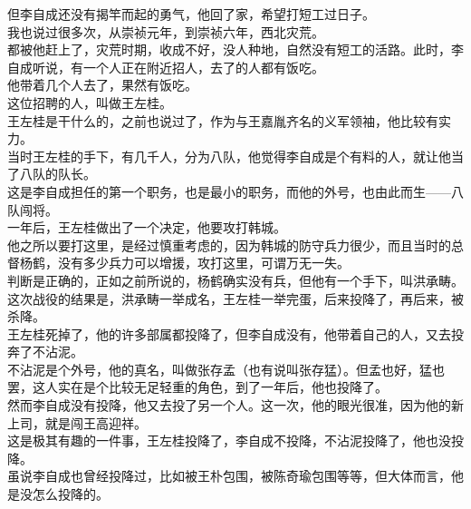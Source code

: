 \begin{multicols}{\theparacolNo}
但李自成还没有揭竿而起的勇气，他回了家，希望打短工过日子。\\

我也说过很多次，从崇祯元年，到崇祯六年，西北灾荒。\\

都被他赶上了，灾荒时期，收成不好，没人种地，自然没有短工的活路。此时，李自成听说，有一个人正在附近招人，去了的人都有饭吃。\\

他带着几个人去了，果然有饭吃。\\

这位招聘的人，叫做王左桂。\\

王左桂是干什么的，之前也说过了，作为与王嘉胤齐名的义军领袖，他比较有实力。\\

当时王左桂的手下，有几千人，分为八队，他觉得李自成是个有料的人，就让他当了八队的队长。\\

这是李自成担任的第一个职务，也是最小的职务，而他的外号，也由此而生——八队闯将。\\

一年后，王左桂做出了一个决定，他要攻打韩城。\\

他之所以要打这里，是经过慎重考虑的，因为韩城的防守兵力很少，而且当时的总督杨鹤，没有多少兵力可以增援，攻打这里，可谓万无一失。\\

判断是正确的，正如之前所说的，杨鹤确实没有兵，但他有一个手下，叫洪承畴。\\

这次战役的结果是，洪承畴一举成名，王左桂一举完蛋，后来投降了，再后来，被杀降。\\

王左桂死掉了，他的许多部属都投降了，但李自成没有，他带着自己的人，又去投奔了不沾泥。\\

不沾泥是个外号，他的真名，叫做张存孟（也有说叫张存猛）。但孟也好，猛也罢，这人实在是个比较无足轻重的角色，到了一年后，他也投降了。\\

然而李自成没有投降，他又去投了另一个人。这一次，他的眼光很准，因为他的新上司，就是闯王高迎祥。\\

这是极其有趣的一件事，王左桂投降了，李自成不投降，不沾泥投降了，他也没投降。\\

虽说李自成也曾经投降过，比如被王朴包围，被陈奇瑜包围等等，但大体而言，他是没怎么投降的。\\


\end{multicols}
